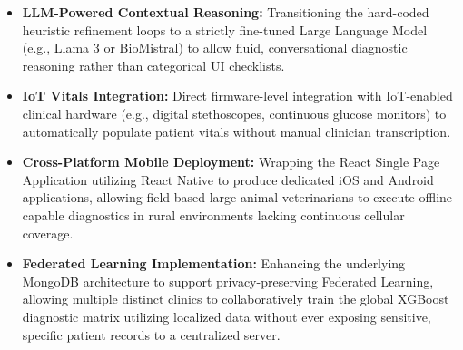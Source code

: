 \documentclass[a4paper,12pt]{report}
\begin{document}
\begin{itemize}
    \item \textbf{LLM-Powered Contextual Reasoning:} Transitioning the hard-coded heuristic refinement loops to a strictly fine-tuned Large Language Model (e.g., Llama 3 or BioMistral) to allow fluid, conversational diagnostic reasoning rather than categorical UI checklists.
    \item \textbf{IoT Vitals Integration:} Direct firmware-level integration with IoT-enabled clinical hardware (e.g., digital stethoscopes, continuous glucose monitors) to automatically populate patient vitals without manual clinician transcription.
    \item \textbf{Cross-Platform Mobile Deployment:} Wrapping the React Single Page Application utilizing React Native to produce dedicated iOS and Android applications, allowing field-based large animal veterinarians to execute offline-capable diagnostics in rural environments lacking continuous cellular coverage.
    \item \textbf{Federated Learning Implementation:} Enhancing the underlying MongoDB architecture to support privacy-preserving Federated Learning, allowing multiple distinct clinics to collaboratively train the global XGBoost diagnostic matrix utilizing localized data without ever exposing sensitive, specific patient records to a centralized server.
\end{itemize}
\end{document}

